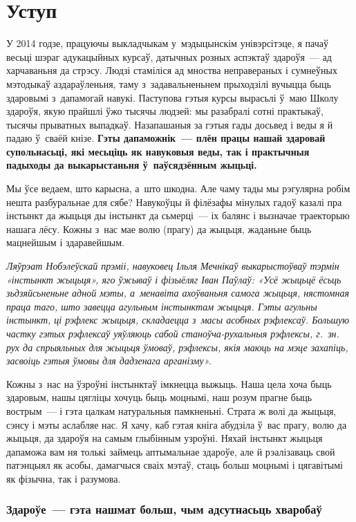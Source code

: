 \chapter*{Уступ}

У 2014 годзе, працуючы выкладчыкам у~мэдыцынскім унівэрсітэце, я пачаў весьці шэраг адукацыйных курсаў, датычных розных аспэктаў здароўя~--- ад харчаваньня да стрэсу. Людзі стаміліся ад мноства неправераных і сумнеўных мэтодыкаў аздараўленьня, таму з~задавальненьнем прыходзілі вучыцца быць здаровымі з~дапамогай навукі. Паступова гэтыя курсы вырасьлі ў~маю Школу здароўя, якую прайшлі ўжо тысячы людзей: мы разабралі сотні практыкаў, тысячы прыватных выпадкаў. Назапашаныя за гэтыя гады досьвед і веды я й падаю ў~сваёй кнізе. \textbf{Гэты дапаможнік~--- плён працы нашай здаровай супольнасьці, які месьціць як навуковыя веды, так і практычныя падыходы да выкарыстаньня ў~паўсядзённым жыцьці.}

Мы ўсе ведаем, што карысна, а~што шкодна. Але чаму тады мы рэгулярна робім нешта разбуральнае для сябе? Навукоўцы й філёзафы мінулых гадоў казалі пра інстынкт да жыцьця ды інстынкт да сьмерці~--- іх балянс і вызначае траекторыю нашага лёсу. Кожны з~нас мае волю (прагу) да жыцьця, жаданьне быць мацнейшым і здаравейшым.

\emph{Ляўрэат Нобэлеўскай прэміі, навуковец Ільля Мечнікаў выкарыстоўваў тэрмін «інстынкт жыцьця», яго ўжываў і фізыёляг Іван Паўлаў: «Усё жыцьцё ёсьць зьдзяйсьненьне адной мэты, а~менавіта ахоўваньня самога жыцьця, нястомная праца таго, што завецца агульным інстынктам жыцьця. Гэты агульны інстынкт, ці рэфлекс жыцьця, складаецца з~масы асобных рэфлексаў. Большую частку гэтых рэфлексаў уяўляюць сабой станоўча-рухальныя рэфлексы, г.~зн. рух да спрыяльных для жыцьця ўмоваў, рэфлексы, якія маюць на мэце захапіць, засвоіць гэтыя ўмовы для дадзенага арганізму».}

Кожны з~нас на ўзроўні інстынктаў імкнецца выжыць. Наша цела хоча быць здаровым, нашы цягліцы хочуць быць моцнымі, наш розум прагне быць вострым~--- і гэта цалкам натуральныя памкненьні. Страта ж волі да жыцьця, сэнсу і мэты аслабляе нас. Я хачу, каб гэтая кніга абудзіла ў~вас прагу, волю да жыцьця, да здароўя на самым глыбінным узроўні. Няхай інстынкт жыцьця дапаможа вам ня толькі займець аптымальнае здароўе, але й рэалізаваць свой патэнцыял як асобы, дамагчыся сваіх мэтаў, стаць больш моцнымі і цягавітымі як фізычна, так і разумова.


\subsection*{Здароўе~--- гэта нашмат больш, чым адсутнасьць хваробаў}


